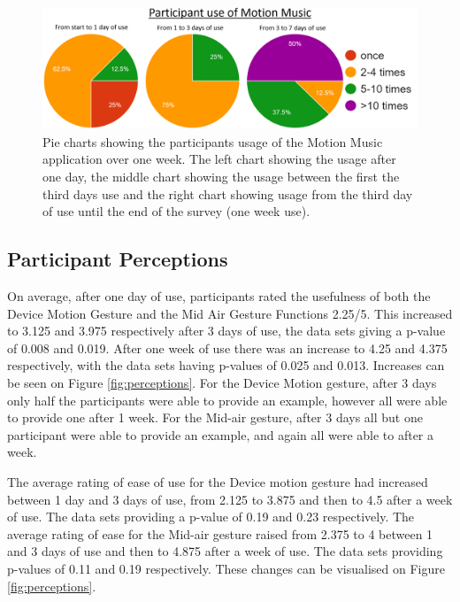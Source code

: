 \documentclass{l4proj}
\begin{document}
\begin{figure}[!htb]
    \centering
    \includegraphics[width=\textwidth]{images/Use of MM.PNG}
        \caption{Pie charts showing the participants usage of the Motion Music application over one week. The left chart showing the usage after one day, the middle chart showing the usage between the first the third days use and the right chart showing usage from the third day of use until the end of the survey (one week use).}
        \label{fig:usage}
\end{figure}

\subsection{Participant Perceptions}

On average, after one day of use, participants rated the usefulness of both the Device Motion Gesture and the Mid Air Gesture Functions 2.25/5. This increased to 3.125 and 3.975 respectively after 3 days of use, the data sets giving a p-value of 0.008 and 0.019. After one week of use there was an increase to 4.25 and 4.375 respectively, with the data sets having p-values of 0.025 and 0.013. Increases can be seen on Figure \ref{fig:perceptions}. For the Device Motion gesture, after 3 days only half the participants were able to provide an example, however all were able to provide one after 1 week. For the Mid-air gesture, after 3 days all but one participant were able to provide an example, and again all were able to after a week.

The average rating of ease of use for the Device motion gesture had increased between 1 day and 3 days of use, from 2.125 to 3.875 and then to 4.5 after a week of use. The data sets providing a p-value of 0.19 and 0.23 respectively. The average rating of ease for the Mid-air gesture raised from 2.375 to 4 between 1 and 3 days of use and then to 4.875 after a week of use. The data sets providing p-values of 0.11 and 0.19 respectively. These changes can be visualised on Figure \ref{fig:perceptions}.
\end{document}

